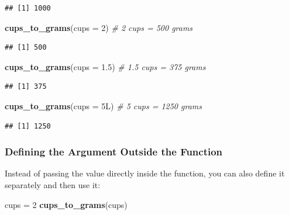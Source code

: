 \documentclass[
]{book}
\newenvironment{Shaded}{\begin{snugshade}}{\end{snugshade}}
\newcommand{\AttributeTok}[1]{\textcolor[rgb]{0.13,0.29,0.53}{#1}}
\newcommand{\CommentTok}[1]{\textcolor[rgb]{0.56,0.35,0.01}{\textit{#1}}}
\newcommand{\DataTypeTok}[1]{\textcolor[rgb]{0.13,0.29,0.53}{#1}}
\newcommand{\DecValTok}[1]{\textcolor[rgb]{0.00,0.00,0.81}{#1}}
\newcommand{\FloatTok}[1]{\textcolor[rgb]{0.00,0.00,0.81}{#1}}
\newcommand{\FunctionTok}[1]{\textcolor[rgb]{0.13,0.29,0.53}{\textbf{#1}}}
\newcommand{\NormalTok}[1]{#1}
\newcommand{\OtherTok}[1]{\textcolor[rgb]{0.56,0.35,0.01}{#1}}
\begin{document}
\begin{verbatim}
## [1] 1000
\end{verbatim}

\begin{Shaded}
\begin{Highlighting}[]
\FunctionTok{cups\_to\_grams}\NormalTok{(}\AttributeTok{cups =} \DecValTok{2}\NormalTok{)    }\CommentTok{\# 2 cups = 500 grams}
\end{Highlighting}
\end{Shaded}

\begin{verbatim}
## [1] 500
\end{verbatim}

\begin{Shaded}
\begin{Highlighting}[]
\FunctionTok{cups\_to\_grams}\NormalTok{(}\AttributeTok{cups =} \FloatTok{1.5}\NormalTok{)  }\CommentTok{\# 1.5 cups = 375 grams}
\end{Highlighting}
\end{Shaded}

\begin{verbatim}
## [1] 375
\end{verbatim}

\begin{Shaded}
\begin{Highlighting}[]
\FunctionTok{cups\_to\_grams}\NormalTok{(}\AttributeTok{cups =} \DecValTok{5}\DataTypeTok{L}\NormalTok{)   }\CommentTok{\# 5 cups = 1250 grams}
\end{Highlighting}
\end{Shaded}

\begin{verbatim}
## [1] 1250
\end{verbatim}

\subsubsection{\texorpdfstring{\textbf{Defining the Argument Outside the Function}}{Defining the Argument Outside the Function}}\label{defining-the-argument-outside-the-function}

Instead of passing the value directly inside the function, you can also define it separately and then use it:

\begin{Shaded}
\begin{Highlighting}[]
\NormalTok{cups }\OtherTok{=} \DecValTok{2}
\FunctionTok{cups\_to\_grams}\NormalTok{(cups)}
\end{Highlighting}
\end{Shaded}
\end{document}

